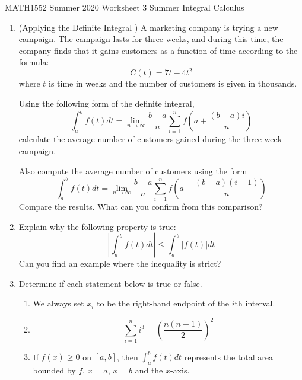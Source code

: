 \documentclass[12pt]{article}
\begin{document}
\noindent
MATH1552 Summer 2020
\hspace{2.2cm}
Worksheet 3 Summer
\hspace{2cm} Integral Calculus

\vspace{2mm}


\begin{enumerate}
 \item   (Applying the Definite Integral ) A marketing company is trying a new campaign. The
campaign lasts for three weeks, and during this time, the company finds that it gains
customers as a function of time according to the formula:
$$C(t)=7t-4t^2$$
where $t$ is time in weeks and the number of customers is given in thousands.

Using the following form of the definite integral,
$$\int_{a}^{b}f(t)dt=\lim_{n\rightarrow \infty}\frac{b-a}{n}\sum_{i=1}^n f(a+\frac{(b-a)i}{n})$$
calculate the average number of customers gained during the three-week campaign.

Also compute the average number of customers using the form
$$\int_{a}^{b}f(t)dt=\lim_{n\rightarrow \infty}\frac{b-a}{n}\sum_{i=1}^n f(a+\frac{(b-a)(i-1)}{n})$$
Compare the results. What can you confirm from this comparison?



\item Explain why the following property is true:
$$\left\vert\int_{a}^{b}f(t)dt\right\vert\leq \int_{a}^b |f(t)|dt$$
Can you find an example where the inequality is strict?


\item Determine if each statement below is true or false.

	\begin{enumerate}
	\item We always set $x_i$ to be the right-hand endpoint of the $i$th interval.

	\item $$\sum_{i=1}^n i^3=\left(\frac{n(n+1)}{2}\right)^2$$

	\item If $f(x)\geq 0$ on $[a,b]$, then $\int_{a}^b f(t)dt$ represents the total area bounded by $f$, $x=a$, $x=b$ and the $x$-axis.
	\end{enumerate}
\end{enumerate}
\end{document}
